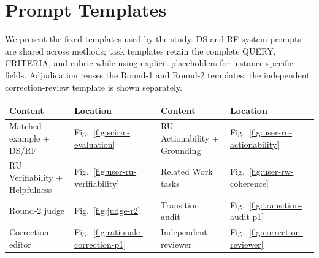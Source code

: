 \newcommand{\TaskPromptPanel}[2]{%
  \begin{promptboxcompact}{#1 - User prompt}%
    \PromptText{#2}%
  \end{promptboxcompact}}

\newcommand{\TaskPromptPanelColumn}[2]{%
  \begin{promptboxcompact}{#1 - User prompt}%
    {\color{aclink}\normalsize\linespread{1.0}\selectfont #2\par}%
  \end{promptboxcompact}}

\begin{table}[p]
\centering
\begin{minipage}{\textwidth}
\section{Prompt Templates}
\label{app:prompts}
\normalsize
We present the fixed templates used by the study. DS and RF system prompts are
shared across methods; task templates retain the complete QUERY, CRITERIA, and
rubric while using explicit placeholders for instance-specific fields.
Adjudication reuses the Round-1 and Round-2 templates; the independent
correction-review template is shown separately.
\end{minipage}
\vspace{0.7\baselineskip}
\begin{center}
\normalsize
\begin{tabular*}{0.94\textwidth}{@{\extracolsep{\fill}}llll@{}}
\toprule
Content & Location & Content & Location \\
\midrule
Matched example + DS/RF & Fig.~\ref{fig:scirm-evaluation} &
RU Actionability + Grounding & Fig.~\ref{fig:user-ru-actionability} \\
RU Verifiability + Helpfulness & Fig.~\ref{fig:user-ru-verifiability} &
Related Work tasks & Fig.~\ref{fig:user-rw-coherence} \\
Round-2 judge & Fig.~\ref{fig:judge-r2} &
Transition audit & Fig.~\ref{fig:transition-audit-p1} \\
Correction editor & Fig.~\ref{fig:rationale-correction-p1} &
Independent reviewer & Fig.~\ref{fig:correction-reviewer} \\
\bottomrule
\end{tabular*}
\captionsetup{hypcap=false}
\label{tab:prompt-map}
\end{center}
\end{table}

